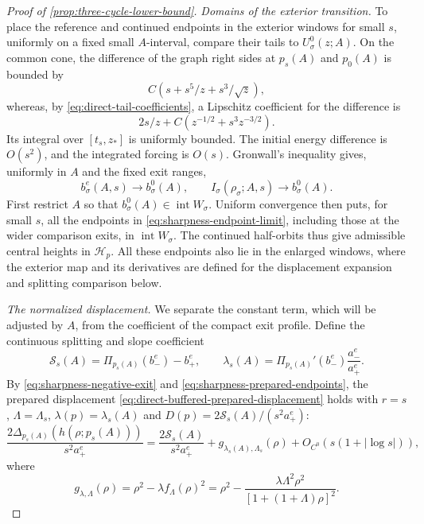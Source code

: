 \begin{proof}[Proof of \cref{prop:three-cycle-lower-bound}]
\emph{Domains of the exterior transition.}
To place the reference and continued endpoints in the exterior windows
for small \(s\), uniformly on a fixed small \(A\)-interval, compare
their tails to \(U_\sigma^0(z;A)\). On the common cone, the difference
of the graph right sides at \(p_s(A)\) and \(p_0(A)\) is bounded by
\[
 C(s+s^5/z+s^3/\sqrt z),
\]
whereas, by \eqref{eq:direct-tail-coefficients}, a Lipschitz
coefficient for the difference is
\begin{equation}
\label{eq:sharpness-tail-comparison}
 2s/z+C(z^{-1/2}+s^3z^{-3/2}).
\end{equation}
Its integral over \([t_s,z_*]\) is uniformly bounded.
The initial energy difference is \(O(s^2)\), and the integrated
forcing is \(O(s)\). Gronwall's inequality gives, uniformly in
\(A\) and the fixed exit ranges,
\begin{equation}
\label{eq:sharpness-endpoint-limit}
 b_\sigma^e(A,s)\longrightarrow b_\sigma^0(A),\qquad
 I_\sigma(\rho_\sigma;A,s)\longrightarrow b_\sigma^0(A).
\end{equation}
First restrict \(A\) so that \(b_\sigma^0(A)\in\operatorname{int}W_\sigma\).
Uniform convergence then puts, for small \(s\), all the endpoints in
\eqref{eq:sharpness-endpoint-limit}, including those at the wider
comparison exits, in \(\operatorname{int}W_\sigma\). The continued
half-orbits thus give admissible central heights in
\(\mathcal H_p\). All these endpoints also lie in the enlarged
windows, where the exterior map and its derivatives are defined for
the displacement expansion and splitting comparison below.

\emph{The normalized displacement.}
We separate the constant term, which will be adjusted by \(A\), from
the coefficient of the compact exit profile. Define the continuous
splitting and slope coefficient
\begin{equation}
\label{eq:sharpness-actual-splitting}
 \mathcal S_s(A)=\Pi_{p_s(A)}(b_-^e)-b_+^e,\qquad
 \lambda_s(A)=\Pi_{p_s(A)}'(b_-^e)\frac{a_-^e}{a_+^e}.
\end{equation}
By \eqref{eq:sharpness-negative-exit} and
\eqref{eq:sharpness-prepared-endpoints}, the prepared displacement
\eqref{eq:direct-buffered-prepared-displacement} holds with \(r=s\),
\(\Lambda=\Lambda_s\), \(\lambda(p)=\lambda_s(A)\) and
\(D(p)=2\mathcal S_s(A)/(s^2a_+^e)\):
\begin{equation}
\label{eq:sharpness-prepared-displacement}
 \frac{2\Delta_{p_s(A)}(h(\rho;p_s(A)))}{s^2a_+^e}
 =\frac{2\mathcal S_s(A)}{s^2a_+^e}
      +g_{\lambda_s(A),\Lambda_s}(\rho)
      +O_{C^0}(s(1+|\log s|)),
\end{equation}
where
\[
 g_{\lambda,\Lambda}(\rho)
   =\rho^2-\lambda f_\Lambda(\rho)^2
   =\rho^2-\frac{\lambda\Lambda^2\rho^2}
                         {[1+(1+\Lambda)\rho]^2}.
\]


\end{proof}
